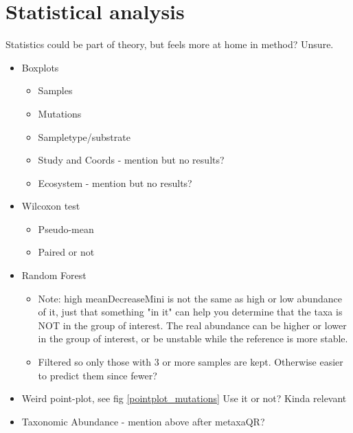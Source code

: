 \section{Statistical analysis}
Statistics could be part of theory, but feels more at home in method? Unsure.
\begin{itemize}
    \item Boxplots
        \begin{itemize}
            \item Samples
            \item Mutations
            \item Sampletype/substrate
            \item Study and Coords - mention but no results?
            \item Ecosystem - mention but no results?
        \end{itemize}
    \item Wilcoxon test
        \begin{itemize}
            \item Pseudo-mean
            \item Paired or not
        \end{itemize}
    \item Random Forest
        \begin{itemize}
            \item Note: high meanDecreaseMini is not the same as high or low abundance of it, just that something "in it" can help you determine that the taxa is NOT in the group of interest. The real abundance can be higher or lower in the group of interest, or be unstable while the reference is more stable.
            \item Filtered so only those with 3 or more samples are kept. Otherwise easier to predict them since fewer?
        \end{itemize}
    \item Weird point-plot, see fig \ref{pointplot_mutations}
        \subitem Use it or not? Kinda relevant
    \item Taxonomic Abundance - mention above after metaxaQR?
\end{itemize}














